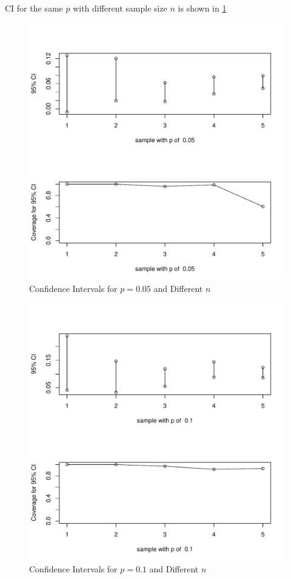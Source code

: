 \documentclass[12pt,letterpaper,titlepage,en-US]{article}
\begin{document}
CI for the same $p$ with different sample size $n$ is shown in \cref{spdn}
\begin{figure}[H]
    \caption{Confidence Intervals for $p = 0.05$ and Different $n$}
    \label{spdn}
    \centering
    \includegraphics[width=.9\textwidth]{figure/sameP005.pdf}
\end{figure}
\begin{figure}[H]
    \caption{Confidence Intervals for $p = 0.1$ and Different $n$}
    \label{sndp}
    \centering
    \includegraphics[width=.9\textwidth]{figure/sameP01.pdf}
\end{figure}
\end{document}

